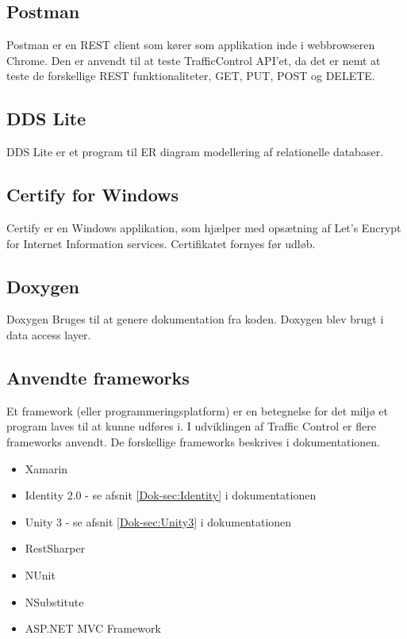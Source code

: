 	\subsection*{Postman} 
	Postman\cite{Postman} er en REST client som kører som applikation inde i 
	webbrowseren Chrome. Den er anvendt til at teste TrafficControl API'et, da 
	det er nemt at teste de forskellige REST funktionaliteter, GET, PUT, POST og 
	DELETE.
	
	\subsection*{DDS Lite}
	DDS Lite\cite{DDSLite} er et program til ER diagram modellering af relationelle databaser. 
	
	\subsection*{Certify for Windows}
	Certify\cite{Certify} er en Windows applikation, som hjælper med opsætning af Let's Encrypt for Internet Information  services. Certifikatet fornyes før udløb.
	
	\subsection*{Doxygen}
	Doxygen \cite{DoxygenInfo} Bruges til at genere dokumentation fra koden. Doxygen blev brugt i data access layer.   
	
	\subsection*{Anvendte frameworks} 
	Et framework (eller programmeringsplatform) er en betegnelse for det miljø 
	et program laves til at kunne udføres i. I udviklingen af Traffic Control 
	er flere frameworks anvendt. De forskellige frameworks beskrives i dokumentationen.
	\begin{itemize}[-]
		\item Xamarin \cite{XamarinDoc}
		\item Identity 2.0 - se afsnit \vref{Dok-sec:Identity} i dokumentationen
		\item Unity 3 - se afsnit \vref{Dok-sec:Unity3} i dokumentationen
		\item RestSharper \cite{RestSharp}
		\item NUnit \cite{NUnit}
		\item NSubstitute \cite{NSubstitute}
		\item ASP.NET MVC Framework \cite{MVC}
					
	\end{itemize}
		
	